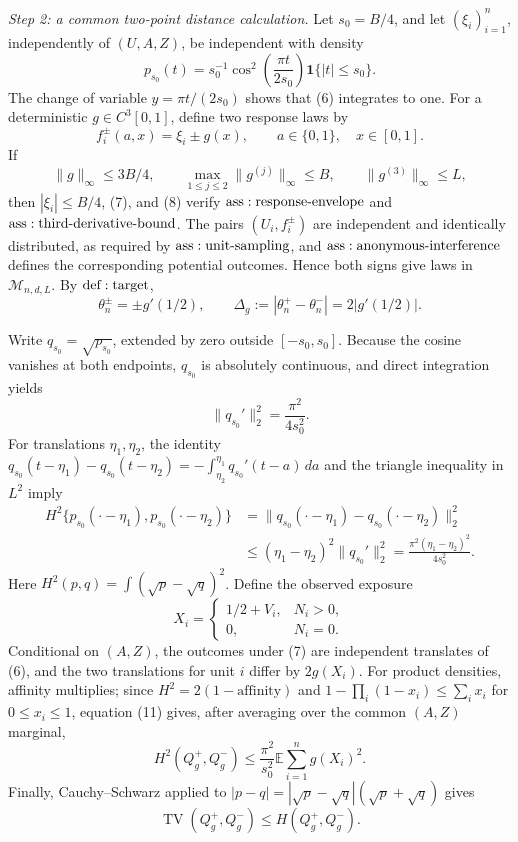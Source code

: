 \textit{Step 2: a common two-point distance calculation.}
Let \(s_0=B/4\), and let \((\xi_i)_{i=1}^n\), independently of \((U,A,Z)\), be independent with density
\[
 p_{s_0}(t)=s_0^{-1}\cos^2\!\left(\frac{\pi t}{2s_0}\right)
 \mathbf 1\{|t|\leq s_0\}.
\tag{6}
\]
The change of variable \(y=\pi t/(2s_0)\) shows that (6) integrates to one.  For a deterministic \(g\in C^3[0,1]\), define two response laws by
\[
 f_i^\pm(a,x)=\xi_i\pm g(x),
 \qquad a\in\{0,1\},\quad x\in[0,1].
\tag{7}
\]
If
\[
 \|g\|_\infty\leq 3B/4,
 \qquad
 \max_{1\leq j\leq2}\|g^{(j)}\|_\infty\leq B,
 \qquad
 \|g^{(3)}\|_\infty\leq L,
\tag{8}
\]
then \(|\xi_i|\leq B/4\), (7), and (8) verify \({\rm ass:response\text{-}envelope}\) and \({\rm ass:third\text{-}derivative\text{-}bound}\).  The pairs \((U_i,f_i^\pm)\) are independent and identically distributed, as required by \({\rm ass:unit\text{-}sampling}\), and \({\rm ass:anonymous\text{-}interference}\) defines the corresponding potential outcomes.  Hence both signs give laws in \(\mathcal M_{n,d,L}\).  By \({\rm def:target}\),
\[
 \theta_n^\pm=\pm g'(1/2),
 \qquad
 \Delta_g:=|\theta_n^+-\theta_n^-|=2|g'(1/2)|.
\tag{9}
\]

Write \(q_{s_0}=\sqrt{p_{s_0}}\), extended by zero outside \([-s_0,s_0]\).  Because the cosine vanishes at both endpoints, \(q_{s_0}\) is absolutely continuous, and direct integration yields
\[
 \|q_{s_0}'\|_2^2=\frac{\pi^2}{4s_0^2}.
\tag{10}
\]
For translations \(\eta_1,\eta_2\), the identity
\(q_{s_0}(t-\eta_1)-q_{s_0}(t-\eta_2)
=-\int_{\eta_2}^{\eta_1}q_{s_0}'(t-a)\,da\) and the triangle inequality in \(L^2\) imply
\[
 \begin{aligned}
 H^2\{p_{s_0}(\mathord\cdot-\eta_1),p_{s_0}(\mathord\cdot-\eta_2)\}
 &=\|q_{s_0}(\mathord\cdot-\eta_1)-q_{s_0}(\mathord\cdot-\eta_2)\|_2^2\\
 &\leq(\eta_1-\eta_2)^2\|q_{s_0}'\|_2^2
 =\frac{\pi^2(\eta_1-\eta_2)^2}{4s_0^2}.
 \end{aligned}
\tag{11}
\]
Here \(H^2(p,q)=\int(\sqrt p-\sqrt q)^2\).  Define the observed exposure
\[
 X_i=\begin{cases}1/2+V_i,&N_i>0,\\0,&N_i=0.\end{cases}
\tag{12}
\]
Conditional on \((A,Z)\), the outcomes under (7) are independent translates of (6), and the two translations for unit \(i\) differ by \(2g(X_i)\).  For product densities, affinity multiplies; since
\(H^2=2(1-\text{affinity})\) and \(1-\prod_i(1-x_i)\leq\sum_i x_i\) for \(0\leq x_i\leq1\), equation (11) gives, after averaging over the common \((A,Z)\) marginal,
\[
 H^2(Q_g^+,Q_g^-)
 \leq\frac{\pi^2}{s_0^2}\mathbb E\sum_{i=1}^ng(X_i)^2.
\tag{13}
\]
Finally, Cauchy--Schwarz applied to \(|p-q|=|\sqrt p-\sqrt q|(\sqrt p+\sqrt q)\) gives
\[
 \operatorname{TV}(Q_g^+,Q_g^-)
 \leq H(Q_g^+,Q_g^-).
\tag{14}
\]


